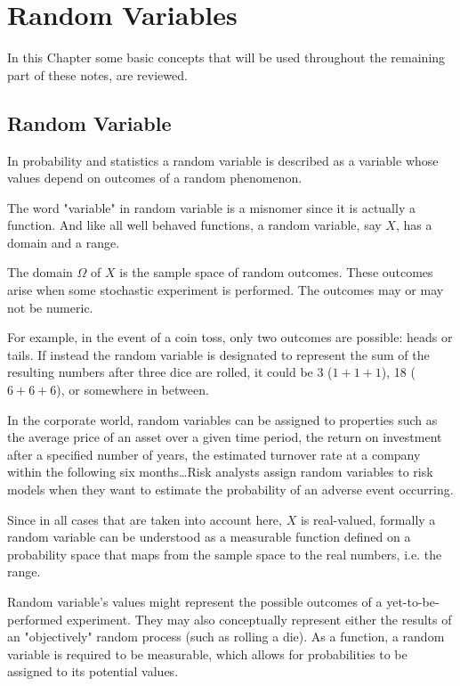 \chapter{Random Variables}
\label{fundamentals}

In this Chapter some basic concepts that will be used throughout the remaining part of these notes, are reviewed.

\section{Random Variable}
\label{random-variables}

In probability and statistics a random variable is described as a variable whose values depend on outcomes of a random phenomenon. 

The word "variable" in random variable is a misnomer since it is actually a function. And like all well behaved functions, a random variable, say $X$, has a domain and a range.

The domain $\Omega$ of $X$ is the sample space of random outcomes. These outcomes arise when some stochastic experiment is performed. The outcomes may or may not be numeric. 

For example, in the event of a coin toss, only two outcomes are possible: heads or tails. If instead the random variable is designated to represent the sum of the resulting numbers after three dice are rolled, it could be 3 ($1 + 1+ 1$), 18 ($6 + 6 + 6$), or somewhere in between.

In the corporate world, random variables can be assigned to properties such as the average price of an asset over a given time period, the return on investment after a specified number of years, the estimated turnover rate at a company within the following six months\ldots Risk analysts assign random variables to risk models when they want to estimate the probability of an adverse event occurring. 

Since in all cases that are taken into account here, $X$ is real-valued, formally a random variable can be understood as a measurable function defined on a probability space that maps from the sample space to the real numbers, i.e. the range.

Random variable's values might represent the possible outcomes of a yet-to-be-performed experiment. They may also conceptually represent either the results of an "objectively" random process (such as rolling a die). As a function, a random variable is required to be measurable, which allows for probabilities to be assigned to its potential values. 


